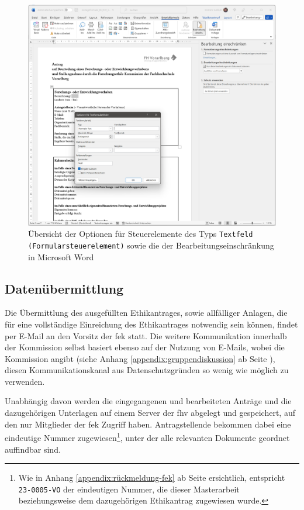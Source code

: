 \documentclass[a4paper,12pt,twoside]{scrreprt}
\begin{document}
\begin{figure}[ht]
    \centering
    \includegraphics[width=\linewidth]{thesis/images/Luidold_Word-Vorlage-FHV-Textformularfeld.png}
    \caption{Übersicht der Optionen für Steuerelemente des Typs \texttt{Textfeld (Formularsteuerelement)} sowie die der Bearbeitungseinschränkung in Microsoft Word}
    \label{fig:optionen-textformularfeld-bearbeitungsmöglichkeiten}
\end{figure}

\subsection{Datenübermittlung}
\label{sub-sec:datenübermittlung}

Die Übermittlung des ausgefüllten Ethikantrages, sowie allfälliger Anlagen, die für eine vollständige Einreichung des Ethikantrages notwendig sein können, findet per E-Mail an den Vorsitz der \ac{fek} statt. \cite{fachhochschule_vorarlberg_gmbh_forschungsethik-kommission_2021} Die weitere Kommunikation innerhalb der Kommission selbst basiert ebenso auf der Nutzung von E-Mails, wobei die Kommission angibt (siehe Anhang \ref{appendix:gruppendiskussion} ab Seite \pageref{appendix:gruppendiskussion}), diesen Kommunikationskanal aus Datenschutzgründen so wenig wie möglich zu verwenden.

Unabhängig davon werden die eingegangenen und bearbeiteten Anträge und die dazugehörigen Unterlagen auf einem Server der \acl{fhv} abgelegt und gespeichert, auf den nur Mitglieder der \ac{fek} Zugriff haben. Antragstellende bekommen dabei eine eindeutige Nummer zugewiesen\footnote{Wie in Anhang \ref{appendix:rückmeldung-fek} ab Seite \pageref{appendix:rückmeldung-fek} ersichtlich, entspricht \texttt{23-0005-VO} der eindeutigen Nummer, die dieser Masterarbeit beziehungsweise dem dazugehörigen Ethikantrag zugewiesen wurde.}, unter der alle relevanten Dokumente geordnet auffindbar sind.
\end{document}
